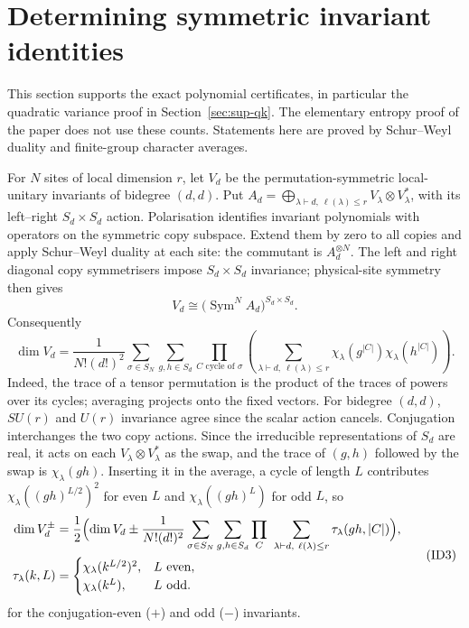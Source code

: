 \section{Determining symmetric invariant identities}\label{sec:fqe-invariant-dimensions}

This section supports the exact polynomial certificates, in particular the quadratic variance proof
in Section~\ref{sec:sup-qk}. The elementary entropy proof of the paper does not use these counts.
Statements here are proved by Schur--Weyl duality and finite-group character averages.

For \(N\) sites of local dimension \(r\), let \(V_d\) be the permutation-symmetric local-unitary
invariants of bidegree \((d,d)\). Put \(A_d=\bigoplus_{\lambda\vdash d,\ \ell(\lambda)\le r}
V_\lambda\otimes V_\lambda^*\), with its left--right \(S_d\times S_d\) action. Polarisation
identifies invariant polynomials with operators on the symmetric copy subspace. Extend them by zero
to all copies and apply Schur--Weyl duality at each site: the commutant is \(A_d^{\otimes N}\). The
left and right diagonal copy symmetrisers impose \(S_d\times S_d\) invariance; physical-site
symmetry then gives \[
V_d\cong\bigl(\operatorname{Sym}^N A_d\bigr)^{S_d\times S_d}.\tag{ID1}\label{eq:fqe-invariant-space}
\] Consequently \[
\dim V_d=\frac1{N!(d!)^2}
\sum_{\sigma\in S_N}\sum_{g,h\in S_d}
\prod_{C\text{ cycle of }\sigma}
\left(\sum_{\lambda\vdash d,\ \ell(\lambda)\le r}
\chi_\lambda(g^{|C|})\chi_\lambda(h^{|C|})\right).\tag{ID2}\label{eq:fqe-invariant-dimension}
\] Indeed, the trace of a tensor permutation is the product of the traces of powers over its cycles;
averaging projects onto the fixed vectors. For bidegree \((d,d)\), \(SU(r)\) and \(U(r)\) invariance
agree since the scalar action cancels. Conjugation interchanges the two copy actions. Since the irreducible representations of
\(S_d\) are real, it acts on each \(V_\lambda\otimes V_\lambda^*\) as the swap, and the trace of
\((g,h)\) followed by the swap is \(\chi_\lambda(gh)\). Inserting it in the average, a cycle of length
\(L\) contributes \(\chi_\lambda((gh)^{L/2})^2\) for even \(L\) and \(\chi_\lambda((gh)^L)\) for odd \(L\), so
\[
\begin{aligned}
\dim V_d^{\pm}&=\frac12\Bigl(\dim V_d\pm\frac1{N!(d!)^2}\sum_{\sigma\in S_N}\sum_{g,h\in S_d}
\prod_{C}\ \sum_{\lambda\vdash d,\ \ell(\lambda)\le r}\tau_\lambda(gh,|C|)\Bigr),\\
\tau_\lambda(k,L)&=\begin{cases}\chi_\lambda(k^{L/2})^2,&L\text{ even},\\ \chi_\lambda(k^L),&L\text{ odd}.\end{cases}
\end{aligned}
\tag{ID3}\label{eq:fqe-invariant-even}
\]
for the conjugation-even ($+$) and odd ($-$) invariants.


